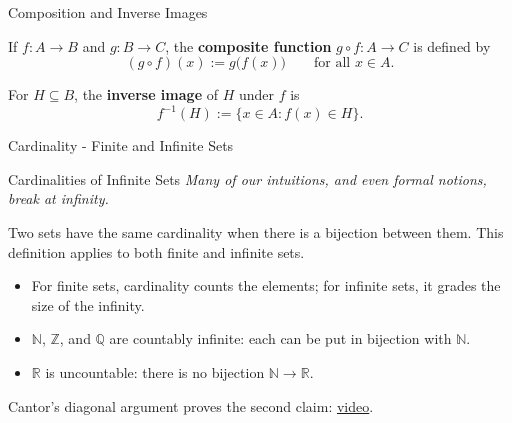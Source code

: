 \documentclass[11pt,aspectratio=169,c]{beamer}
\begin{document}
\begin{frame}{Composition and Inverse Images}
\begin{definitionbox}[1.1.12 Definition]
If $f:A\to B$ and $g:B\to C$, the \textbf{composite function}
$g\circ f:A\to C$ is defined by
\[
(g\circ f)(x):=g\bigl(f(x)\bigr)\qquad\text{for all }x\in A.
\]
\end{definitionbox}

\begin{definitionbox}[1.1.7 Definition]
For $H\subseteq B$, the \textbf{inverse image} of $H$ under $f$ is
\[
f^{-1}(H):=\{x\in A:f(x)\in H\}.
\]
\end{definitionbox}

\end{frame}

\begin{frame}{Cardinality - Finite and Infinite Sets}
\begin{definitionbox}[1.3.1 Definition]
\end{definitionbox}

\begin{definitionbox}[1.3.6 Definition]
\end{definitionbox}
\end{frame}


\begin{frame}{Cardinalities of Infinite Sets}
\emph{Many of our intuitions, and even formal notions, break at
infinity.}

\begin{definitionbox}
Two sets have the same cardinality when there is a bijection between them.
This definition applies to both finite and infinite sets.
\end{definitionbox}

\begin{itemize}
    \item For finite sets, cardinality counts the elements;
    for infinite sets, it grades the size of the infinity.
    \item $\mathbb{N}$, $\mathbb{Z}$, and $\mathbb{Q}$ are countably infinite:
    each can be put in bijection with $\mathbb{N}$.
    \item $\mathbb{R}$ is uncountable: there is no bijection
    $\mathbb{N}\to\mathbb{R}$.
\end{itemize}

\centering
Cantor's diagonal argument proves the second claim:
\href{https://www.youtube.com/watch?v=YIZd23zGV3M}{video}.
\end{frame}
\end{document}
